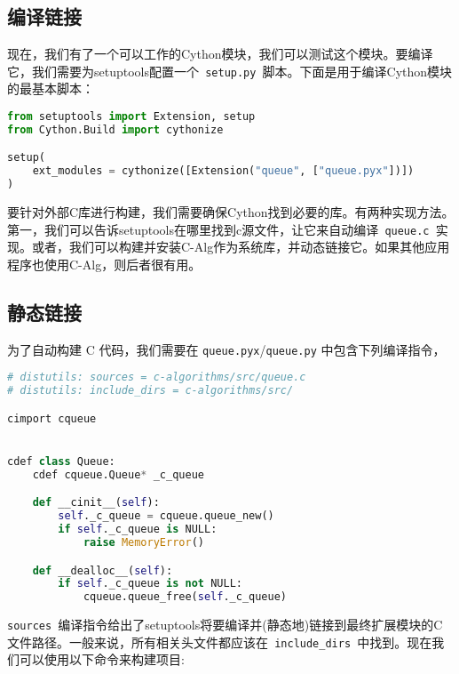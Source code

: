 \begin{translation}
\section{编译链接}

现在，我们有了一个可以工作的Cython模块，我们可以测试这个模块。要编译它，我们需要为setuptools配置一个\lstinline{ setup.py }脚本。下面是用于编译Cython模块的最基本脚本：

\begin{framed}
\begin{lstlisting}[language=python]
from setuptools import Extension, setup
from Cython.Build import cythonize

setup(
    ext_modules = cythonize([Extension("queue", ["queue.pyx"])])
)
\end{lstlisting}
\end{framed}

要针对外部C库进行构建，我们需要确保Cython找到必要的库。有两种实现方法。第一，我们可以告诉setuptools在哪里找到c源文件，让它来自动编译\lstinline{ queue.c }实现。或者，我们可以构建并安装C-Alg作为系统库，并动态链接它。如果其他应用程序也使用C-Alg，则后者很有用。

\subsection{静态链接}

为了自动构建 C 代码，我们需要在 \lstinline{queue.pyx}/\lstinline{queue.py} 中包含下列编译指令，

\begin{framed}
\begin{lstlisting}[language=python]
# distutils: sources = c-algorithms/src/queue.c
# distutils: include_dirs = c-algorithms/src/

cimport cqueue


cdef class Queue:
    cdef cqueue.Queue* _c_queue

    def __cinit__(self):
        self._c_queue = cqueue.queue_new()
        if self._c_queue is NULL:
            raise MemoryError()

    def __dealloc__(self):
        if self._c_queue is not NULL:
            cqueue.queue_free(self._c_queue)
\end{lstlisting}
\end{framed}

\lstinline{sources }编译指令给出了setuptools将要编译并(静态地)链接到最终扩展模块的C文件路径。一般来说，所有相关头文件都应该在\lstinline{ include_dirs }中找到。现在我们可以使用以下命令来构建项目:


\end{translation}
